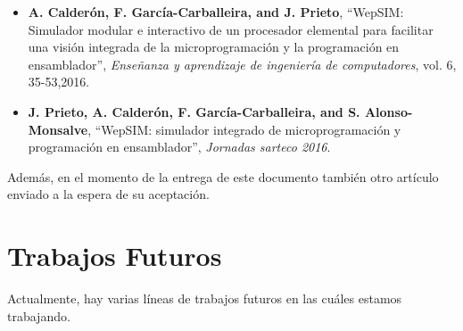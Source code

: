 \begin{itemize}

\item \textbf{A. Calderón, F. García-Carballeira, and J. Prieto}, “WepSIM: Simulador modular e interactivo de un procesador elemental para facilitar una visión integrada de la microprogramación y la programación en ensamblador”, \textit{Enseñanza y aprendizaje de ingeniería de computadores}, vol. 6, 35-53,2016. \cite{mateos2016wepsim}

\item \textbf{J. Prieto, A. Calderón, F. García-Carballeira, and S. Alonso-Monsalve}, “WepSIM: simulador integrado de microprogramación y programación en ensamblador”, \textit{Jornadas sarteco 2016}. \cite{arcos2032}

\end{itemize}

Además, en el momento de la entrega de este documento también otro artículo enviado a la espera de su aceptación.

\section{Trabajos Futuros}

Actualmente, hay varias líneas de trabajos futuros en las cuáles estamos trabajando.

